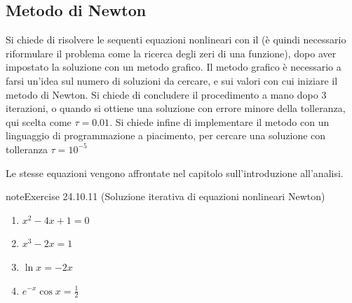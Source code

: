 \documentclass[letterpaper,10pt,italian]{jupyterBook}
\begin{document}
\subsection{Metodo di Newton}
\label{\detokenize{ch/infinitesimal_calculus/derivatives-problems:metodo-di-newton}}\label{\detokenize{ch/infinitesimal_calculus/derivatives-problems:infinitesimal-calculus-derivatives-problems-newton}}
\sphinxAtStartPar
Si chiede di risolvere le sequenti equazioni nonlineari con il {\hyperref[\detokenize{ch/infinitesimal_calculus/derivatives:infinitesimal-calculus-derivatives-applications-newton}]{}} (è quindi necessario riformulare il problema come la ricerca degli zeri di una funzione), dopo aver impostato la soluzione con un metodo grafico. Il metodo grafico è necessario a farsi un’idea sul numero di soluzioni da cercare, e sui valori con cui iniziare il metodo di Newton. Si chiede di concludere il procedimento a mano dopo 3 iterazioni, o quando si ottiene una soluzione con errore minore della tolleranza, qui scelta come \(\tau = 0.01\). Si chiede infine di implementare il metodo con un linguaggio di programmazione a piacimento, per cercare una soluzione con tolleranza \(\tau = 10^{-5}\)

\sphinxAtStartPar
Le stesse equazioni vengono affrontate {\hyperref[\detokenize{ch/infinitesimal_calculus/analysis-problems:infinitesimal-calculus-analysis-problems-bisection}]{}} nel capitolo sull’introduzione all’analisi.
 \label{exercise:ch/infinitesimal_calculus/derivatives-problems-exercise-10}

\begin{sphinxadmonition}{note}{Exercise 24.10.11 (Soluzione iterativa di equazioni nonlineari \sphinxhyphen{} Newton)}


\begin{enumerate}
%
\item {} 
\sphinxAtStartPar
\(x^2 - 4x + 1 = 0 \)

\item {} 
\sphinxAtStartPar
\(x^3 - 2x = 1\)

\item {} 
\sphinxAtStartPar
\(\ln x = - 2 x\)

\item {} 
\sphinxAtStartPar
\(e^{-x} \cos x = \frac{1}{2}\)

\end{enumerate}
\end{sphinxadmonition}
\end{document}
